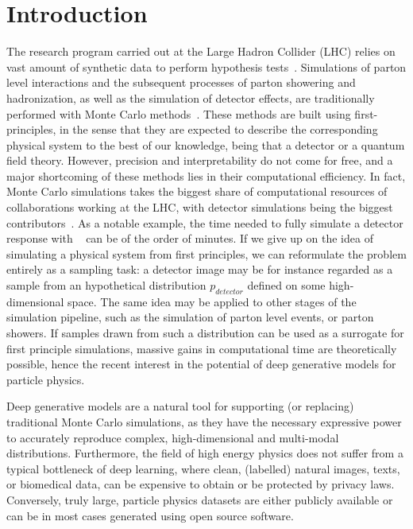 
\chapter{Introduction}\label{chap:introduction}
\enlargethispage{2ex}
\vspace*{-2pt}

The research program carried out at the Large Hadron Collider (LHC) relies on vast amount of synthetic data to perform hypothesis tests~\cite{Apostolakis:2308666, Aarrestad:2729448, Calafiura:2729668, ATL-SOFT-PUB-2018-002}. Simulations of parton level interactions and the subsequent processes of parton showering and hadronization, as well as the simulation of detector effects, are traditionally performed with Monte Carlo methods~\cite{delphes, madgraph, pythia}. These methods are built using first-principles, in the sense that they are expected to describe the corresponding physical system to the best of our knowledge, being that a detector or a quantum field theory. 
However, precision and interpretability do not come for free, and a major shortcoming of these methods lies in their computational efficiency. In fact, Monte Carlo simulations takes the biggest share of computational resources of collaborations working at the LHC, with detector simulations being the biggest contributors~\cite{Calafiura:2729668}. As a notable example, the time needed to fully simulate a detector response with \geant~\cite{AGOSTINELLI2003250} can be of the order of minutes.
If we give up on the idea of simulating a physical system from first principles, we can reformulate the problem entirely as a sampling task: a detector image may be for instance regarded as a sample from an hypothetical distribution $p_{detector}$ defined on some high-dimensional space. The same idea may be applied to other stages of the simulation pipeline, such as the simulation of parton level events, or parton showers.
If samples drawn from such a distribution can be used as a surrogate for first principle simulations, massive gains in computational time are theoretically possible, hence the recent interest in the potential of deep generative models for particle physics\cite{aachen_wgan1, aachen_wgan2, Erdmann:2018kuh, wgan_0, calogan1, calogan2, 2020GANpileup, 2019Lund, DijetGAN1, DijetGAN2, Diefenbacher:2020rna, 2021Getting, ATL-SOFT-PUB-2018-001, 2020iflow1, 2020iflow2, dohi2020variational}. 


Deep generative models are a natural tool for supporting  (or replacing) traditional Monte Carlo simulations, as they have the necessary expressive power to accurately reproduce complex, high-dimensional and multi-modal distributions. Furthermore, the field of high energy physics does not suffer from a typical bottleneck of deep learning, where clean, (labelled) natural images, texts, or biomedical data, can be expensive to obtain or be protected by privacy laws. Conversely, truly large, particle physics datasets are either publicly available or can be in most cases generated using open source software.

